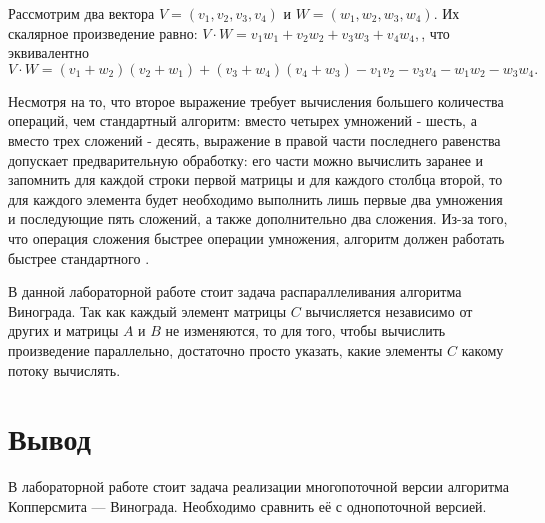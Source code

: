 Рассмотрим два вектора $V = (v_1, v_2, v_3, v_4)$ и $W = (w_1, w_2, w_3, w_4)$.
Их скалярное произведение равно: $V\cdot W = v_1w_1 + v_2w_2 + v_3w_3 + v_4w_4,$, что эквивалентно
\begin{equation}
V\cdot W = (v_1 + w_2)(v_2 + w_1) + (v_3 + w_4)(v_4 + w_3) - v_1v_2 - v_3v_4 - w_1w_2 - w_3w_4.
\end{equation}

Несмотря на то, что второе выражение требует вычисления большего количества операций, чем стандартный алгоритм: вместо четырех умножений - шесть, а вместо трех сложений - десять, выражение в правой части последнего равенства допускает предварительную обработку: его части можно вычислить заранее и запомнить для каждой строки первой матрицы и для каждого столбца второй, то для каждого элемента будет необходимо выполнить лишь первые два умножения и последующие пять сложений, а также дополнительно два сложения.
Из-за того, что операция сложения быстрее операции умножения, алгоритм должен работать быстрее стандартного \cite{Pogorelov}.

В данной лабораторной работе стоит задача распараллеливания алгоритма Винограда.
Так как каждый элемент матрицы $C$ вычисляется независимо от других и матрицы $A$ и $B$ не изменяются, то для того, чтобы вычислить произведение параллельно, достаточно просто указать, какие элементы $C$ какому потоку вычислять.


\section*{Вывод}
В лабораторной работе стоит задача реализации многопоточной версии алгоритма Копперсмита — Винограда.
Необходимо сравнить её с однопоточной версией.
